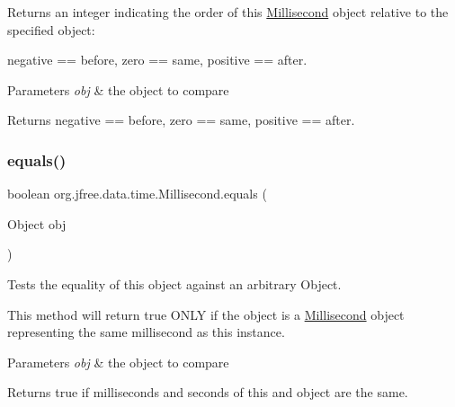 Returns an integer indicating the order of this \mbox{\hyperlink{classorg_1_1jfree_1_1data_1_1time_1_1_millisecond}{Millisecond}} object relative to the specified object\+:

negative == before, zero == same, positive == after.


\begin{DoxyParams}{Parameters}
{\em obj} & the object to compare\\
\hline
\end{DoxyParams}
\begin{DoxyReturn}{Returns}
negative == before, zero == same, positive == after. 
\end{DoxyReturn}
\mbox{\label{classorg_1_1jfree_1_1data_1_1time_1_1_millisecond_a1faa084fe97879d8ba56b68de91d2a24}} 
\subsubsection{\texorpdfstring{equals()}{equals()}}
{\footnotesize\ttfamily boolean org.\+jfree.\+data.\+time.\+Millisecond.\+equals (\begin{DoxyParamCaption}\item[{Object}]{obj }\end{DoxyParamCaption})}

Tests the equality of this object against an arbitrary Object. 

This method will return true O\+N\+LY if the object is a \mbox{\hyperlink{classorg_1_1jfree_1_1data_1_1time_1_1_millisecond}{Millisecond}} object representing the same millisecond as this instance.


\begin{DoxyParams}{Parameters}
{\em obj} & the object to compare\\
\hline
\end{DoxyParams}
\begin{DoxyReturn}{Returns}
{\ttfamily true} if milliseconds and seconds of this and object are the same. 
\end{DoxyReturn}
\mbox{\label{classorg_1_1jfree_1_1data_1_1time_1_1_millisecond_a1911c22a597714f32bf790aa1f358950}} 
